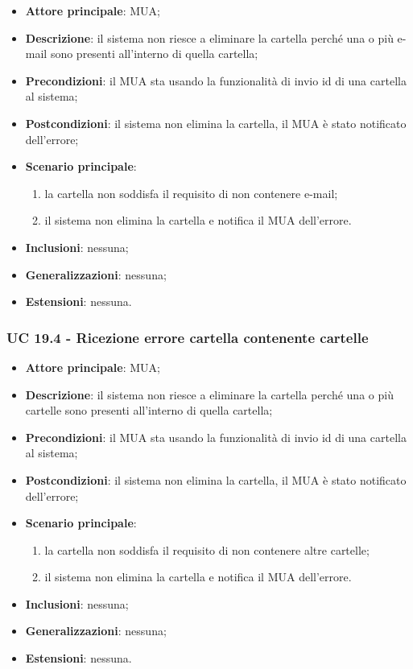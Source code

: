     \begin{itemize}
        \item \textbf{Attore principale}: MUA;
        \item \textbf{Descrizione}: il sistema non riesce a eliminare la cartella perché una o più e-mail sono presenti all'interno di quella cartella;
        \item \textbf{Precondizioni}: il MUA sta usando la funzionalità di invio id di una cartella al sistema;
        \item \textbf{Postcondizioni}: il sistema non elimina la cartella, il MUA è stato notificato dell'errore;
        \item \textbf{Scenario principale}:
            \begin{enumerate}
                \item la cartella non soddisfa il requisito di non contenere e-mail;
                \item il sistema non elimina la cartella e notifica il MUA dell'errore.
            \end{enumerate}
        \item \textbf{Inclusioni}: nessuna;
        \item \textbf{Generalizzazioni}: nessuna;
        \item \textbf{Estensioni}: nessuna.
    \end{itemize}


    \subsubsection{UC 19.4 - Ricezione errore cartella contenente cartelle} \label{sec:UC19.4}

    \begin{itemize}
        \item \textbf{Attore principale}: MUA;
        \item \textbf{Descrizione}: il sistema non riesce a eliminare la cartella perché una o più cartelle sono presenti all'interno di quella cartella;
        \item \textbf{Precondizioni}: il MUA sta usando la funzionalità di invio id di una cartella al sistema;
        \item \textbf{Postcondizioni}: il sistema non elimina la cartella, il MUA è stato notificato dell'errore;
        \item \textbf{Scenario principale}:
            \begin{enumerate}
                \item la cartella non soddisfa il requisito di non contenere altre cartelle;
                \item il sistema non elimina la cartella e notifica il MUA dell'errore.
            \end{enumerate}
        \item \textbf{Inclusioni}: nessuna;
        \item \textbf{Generalizzazioni}: nessuna;
        \item \textbf{Estensioni}: nessuna.
    \end{itemize}

